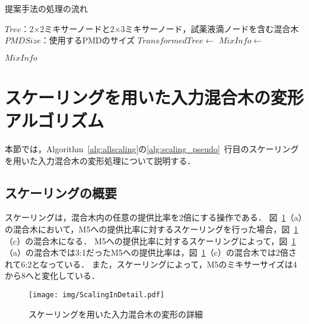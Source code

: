 \begin{algorithm}[tbp]
 \caption{提案手法の処理の流れ}\label{alg:allscaling}
 \begin{algorithmic}[1]
     \Require $\mathit{Tree}$：2$\times$2ミキサーノードと2$\times$3ミキサーノード，試薬液滴ノードを含む混合木
     \Require $\mathit{PMDSize}$：使用するPMDのサイズ
     \State $\mathit{TransformedTree} \gets$  \label{alg:scaling_pseudo}
     \State $\mathit{MixInfo \gets}$  \label{alg:samplepreparation_pseudo}

      \Return $\mathit{MixInfo}$
 \end{algorithmic}
\end{algorithm}

\section{スケーリングを用いた入力混合木の変形アルゴリズム}
本節では，Algorithm~\ref{alg:allscaling}の\ref{alg:scaling_pseudo}~行目のスケーリングを用いた入力混合木の変形処理について説明する．
\subsection{スケーリングの概要}\label{sec:ScalingAbout}
スケーリングは，混合木内の任意の提供比率を2倍にする操作である．
図~\ref{fig:ScalingInDetail}（a）の混合木において，M5への提供比率に対するスケーリングを行った場合，図~\ref{fig:ScalingInDetail}（c）の混合木になる．
M5への提供比率に対するスケーリングによって，図~\ref{fig:ScalingInDetail}（a）の混合木では3:1だったM5への提供比率は，図~\ref{fig:ScalingInDetail}（c）の混合木では2倍されて6:2となっている．
また，スケーリングによって，M5のミキサーサイズは4から8へと変化している．


\begin{figure}[tbp]
 \centering\texttt{[image: img/ScalingInDetail.pdf]}
 \caption{スケーリングを用いた入力混合木の変形の詳細}\label{fig:ScalingInDetail}
\end{figure}

